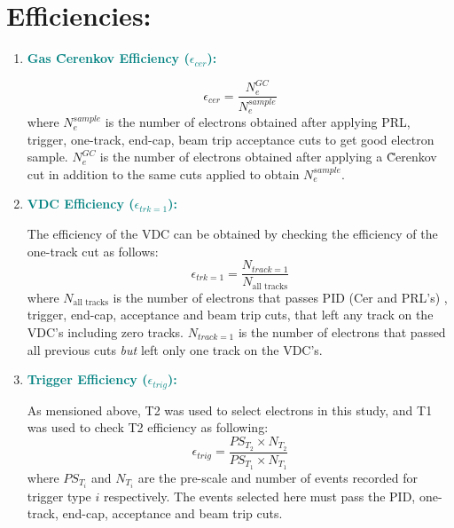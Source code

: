 \documentclass[11pt]{article}
\begin{document}
\section{Efficiencies:}
\begin{enumerate}
 \item{\textcolor{teal}{\textbf{Gas \~Cerenkov Efficiency ($\epsilon_{cer}$):}}}\par
 
\begin{equation}
\epsilon_{cer}=\frac{N_{e}^{GC}}{N_{e}^{sample}}
\end{equation}
   where $N_{e}^{sample}$ is the number of electrons obtained after applying PRL, trigger, one-track, end-cap, beam trip acceptance cuts to get good electron sample. $N_{e}^{GC}$ is the number of electrons obtained after applying  a \~Cerenkov cut in addition to the same cuts applied to obtain  $N_{e}^{sample}$. 
\item{\textcolor{teal}{\textbf{VDC Efficiency ($\epsilon_{trk=1}$): }}}\par
 The efficiency of the VDC can be obtained by checking the efficiency of the one-track cut as follows: 
\begin{equation}
\epsilon_{trk=1}=\frac{N_{track=1}}{N_{\text{all tracks}}}
\end{equation}
where  $N_{\text{all tracks}}$ is the number of electrons that passes PID (Cer and PRL's) , trigger, end-cap, acceptance and beam trip cuts, that left any track on the VDC's including zero tracks. $N_{track=1}$ is the number of electrons that passed all previous cuts \emph{but} left only one track on the VDC's.
\item{\textcolor{teal}{\textbf{Trigger Efficiency ($\epsilon_{trig}$):}}}\par
As mensioned above, T2 was used to select electrons in this study, and T1 was used to check T2 efficiency as following:
 \begin{equation}
 \epsilon_{trig}=\frac{PS_{T_{2}}\times N_{T_{2}}}{PS_{T_{1}} \times N_{T_{1}}}
  \end{equation}
 where $PS_{T_{i}}$ and $N_{T_{i}}$ are the pre-scale and number of events recorded for trigger type $i$ respectively. The events selected here must pass the PID, one-track, end-cap, acceptance and beam trip cuts. 
  \end{enumerate}
\end{document}

